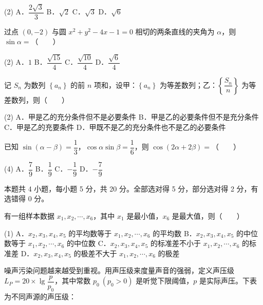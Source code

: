 \begin{gkopts}(2)
\task A．$\dfrac{2\sqrt3}3$
\task B．$\sqrt2$
\task C．$\sqrt3$
\task D．$\sqrt6$
\end{gkopts}

过点 $(0,-2)$ 与圆 $x^{2}+y^{2}-4x-1=0$ 相切的两条直线的夹角为 $\alpha$，则 $\sin\alpha=$（　　）

\begin{gkopts}(2)
\task A．$1$
\task B．$\dfrac{\sqrt{15}}4$
\task C．$\dfrac{\sqrt{10}}4$
\task D．$\dfrac{\sqrt6}4$
\end{gkopts}

记 $S_n$ 为数列 $\left\{a_n\right\}$ 的前 $n$ 项和，设甲：$\left\{a_n\right\}$ 为等差数列；乙：$\left\{\dfrac{S_n}n\right\}$ 为等差数列，则（　　）

\begin{gkopts}(2)
\task A．甲是乙的充分条件但不是必要条件
\task B．甲是乙的必要条件但不是充分条件
\task C．甲是乙的充要条件
\task D．甲既不是乙的充分条件也不是乙的必要条件
\end{gkopts}

已知 $\sin(\alpha-\beta)=\dfrac13$，$\cos\alpha\sin\beta=\dfrac16$，则 $\cos(2\alpha+2\beta)=$（　　）

\begin{gkopts}(4)
\task A．$\dfrac79$
\task B．$\dfrac19$
\task C．$-\dfrac19$
\task D．$-\dfrac79$
\end{gkopts}

\par\medskip


\begin{gktip}
本题共 4 小题，每小题 5 分，共 20 分。全部选对得 5 分，部分选对得 2 分，有选错得 0 分。
\end{gktip}

有一组样本数据 $x_1,x_2,\cdots,x_6$，其中 $x_1$ 是最小值，$x_6$ 是最大值，则（　　）

\begin{gkopts}(1)
\task A．$x_2,x_3,x_4,x_5$ 的平均数等于 $x_1,x_2,\cdots,x_6$ 的平均数
\task B．$x_2,x_3,x_4,x_5$ 的中位数等于 $x_1,x_2,\cdots,x_6$ 的中位数
\task C．$x_2,x_3,x_4,x_5$ 的标准差不小于 $x_1,x_2,\cdots,x_6$ 的标准差
\task D．$x_2,x_3,x_4,x_5$ 的极差不大于 $x_1,x_2,\cdots,x_6$ 的极差
\end{gkopts}

噪声污染问题越来越受到重视。用声压级来度量声音的强弱，定义声压级 $L_P=20\times\lg\dfrac p{p_0}$，其中常数 $p_0\ (p_0>0)$ 是听觉下限阈值，$p$ 是实际声压。下表为不同声源的声压级：

